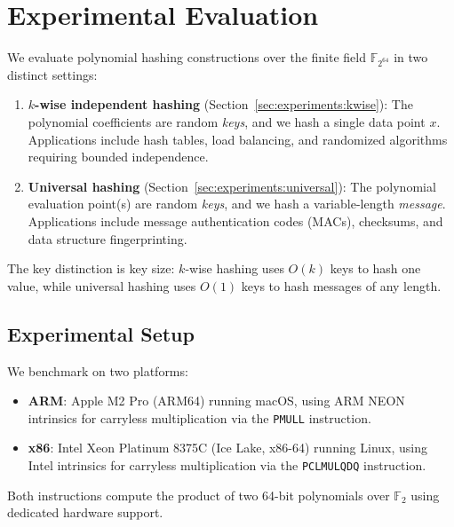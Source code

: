 
\section{Experimental Evaluation}
\label{sec:experiments}

We evaluate polynomial hashing constructions over the finite field $\mathbb{F}_{2^{64}}$
in two distinct settings:
\begin{enumerate}
    \item \textbf{$k$-wise independent hashing} (Section~\ref{sec:experiments:kwise}):
          The polynomial coefficients are random \emph{keys}, and we hash a single data point $x$.
          Applications include hash tables, load balancing, and randomized algorithms
          requiring bounded independence.
    \item \textbf{Universal hashing} (Section~\ref{sec:experiments:universal}):
          The polynomial evaluation point(s) are random \emph{keys}, and we hash a
          variable-length \emph{message}.
          Applications include message authentication codes (MACs), checksums,
          and data structure fingerprinting.
\end{enumerate}
The key distinction is key size: $k$-wise hashing uses $O(k)$ keys to hash one value,
while universal hashing uses $O(1)$ keys to hash messages of any length.

\subsection{Experimental Setup}

We benchmark on two platforms:
\begin{itemize}
    \item \textbf{ARM}: Apple M2 Pro (ARM64) running macOS, using ARM NEON intrinsics
          for carryless multiplication via the \texttt{PMULL} instruction.
    \item \textbf{x86}: Intel Xeon Platinum 8375C (Ice Lake, x86-64) running Linux, using Intel intrinsics
          for carryless multiplication via the \texttt{PCLMULQDQ} instruction.
\end{itemize}
Both instructions compute the product of two 64-bit polynomials over $\mathbb{F}_2$
using dedicated hardware support.

